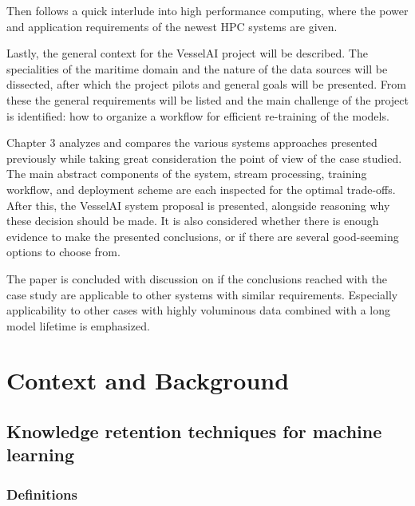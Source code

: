 Then follows a quick interlude into high performance computing, where the power and application requirements of the newest HPC systems are given.

Lastly, the general context for the VesselAI project will be described. The specialities of the maritime domain and the nature of the data sources will be dissected, after which the project pilots and general goals will be presented. From these the general requirements will be listed and the main challenge of the project is identified: how to organize a workflow for efficient re-training of the models.

Chapter 3 analyzes and compares the various systems approaches presented previously while taking great consideration the point of view of the case studied. The main abstract components of the system, stream processing, training workflow, and deployment scheme are each inspected for the optimal trade-offs. After this, the VesselAI system proposal is presented, alongside reasoning why these decision should be made. It is also considered whether there is enough evidence to make the presented conclusions, or if there are several good-seeming options to choose from.

The paper is concluded with discussion on if the conclusions reached with the case study are applicable to other systems with similar requirements. Especially applicability to other cases with highly voluminous data combined with a long model lifetime is emphasized.

\chapter{Context and Background}

\section{Knowledge retention techniques for machine learning}

\subsection{Definitions}




